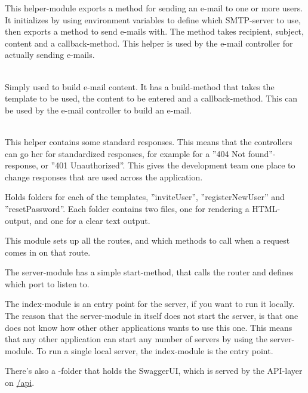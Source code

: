 \begin{description}
\begin{description}
                This helper-module exports a method for sending an e-mail to one or more users. It initializes by using environment variables to define which \gls{SMTP}-server to use, then exports a method to send e-mails with. The method takes recipient, subject, content and a callback-method. This helper is used by the e-mail controller for actually sending e-mails.
            \item{} \\
                Simply used to build e-mail content. It has a build-method that takes the template to be used, the content to be entered and a callback-method. This can be used by the e-mail controller to build an e-mail.
            \item{} \\
                This helper contains some standard responses. This means that the controllers can go her for standardized responses, for example for a ''404 Not found''-response, or ''401 Unauthorized''. This gives the development team one place to change responses that are used across the application.
        \end{description}
    \item{\textbf{}} Holds folders for each of the templates, ''inviteUser'', ''registerNewUser'' and ''resetPassword''. Each folder contains two files, one for rendering a HTML-output, and one for a clear text output.
    \item{\textbf{}} This module sets up all the routes, and which methods to call when a request comes in on that route. 
    \item{\textbf{}} The server-module has a simple start-method, that calls the router and defines which port to listen to.
    \item{\textbf{}} The index-module is an entry point for the server, if you want to run it locally. The reason that the server-module in itself does not start the server, is that one does not know how other other applications wants to use this one. This means that any other application can start any number of servers by using the server-module. To run a single local server, the index-module is the entry point. 
\end{description}

There's also a -folder that holds the SwaggerUI, which is served by the API-layer on \url{/api}.\cite{swagger-ui}

